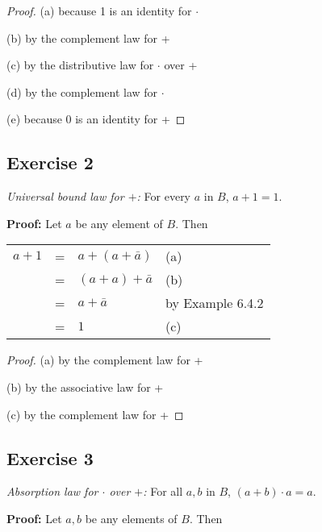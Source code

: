 \documentclass[14pt]{extarticle}
\newcommand{\fbl}{\underline{\hspace{1cm}}\,\,}
\newcommand{\cy}{\color{cyan}}
\begin{document}
\begin{proof}
  {\cy (a)} because 1 is an identity for $\cdot$

  {\cy (b)} by the complement law for +

  {\cy (c)} by the distributive law for $\cdot$ over +

  {\cy (d)} by the complement law for $\cdot$

  {\cy (e)} because 0 is an identity for +
\end{proof}

\subsection{Exercise 2}
{\it Universal bound law for $+$:} For every $a$ in $B$, \(a + 1 = 1\).

  {\bf Proof:} Let $a$ be any element of $B$. Then

\begin{center}
  \begin{tabular}{rcll}
    \(a+1\) & = & \(a+(a+\bar{a})\) & {\cy (a) \fbl}         \\
    \(\)    & = & \((a+a)+\bar{a}\) & {\cy (b) \fbl}         \\
    \(\)    & = & \(a + \bar{a}\)   & {\cy by Example 6.4.2} \\
    \(\)    & = & \(1\)             & {\cy (c) \fbl}
  \end{tabular}
\end{center}

\begin{proof}
  {\cy (a)} by the complement law for +

  {\cy (b)} by the associative law for +

  {\cy (c)} by the complement law for +
\end{proof}

\subsection{Exercise 3}
{\it Absorption law for $\cdot$ over $+$:} For all $a, b$ in $B$, \((a + b) \cdot a = a\).

  {\bf Proof:} Let $a, b$ be any elements of $B$. Then
\end{document}
